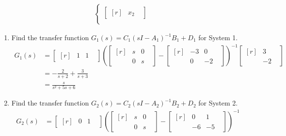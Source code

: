 \documentclass[11pt]{article}
\begin{document}
\begin{enumerate}
\begin{align*}
\begin{cases}
\begin{bmatrix*}[r]
                &x_2&
            \end{bmatrix*}\\
        \end{cases}
    \end{align*}
    \begin{enumerate}
        \item Find the transfer function \(G_1(s)=C_1{(sI-A_1)}^{-1}B_1+D_1\) for System 1.
        \begin{align*}
            G_1(s)&=
            \begin{bmatrix*}[r]
                &1&1&
            \end{bmatrix*}
            {\left(
                \begin{bmatrix*}[r]
                    &s & 0&\\
                    &0 & s&
                \end{bmatrix*}-
                \begin{bmatrix*}[r]
                    &-3 & 0&\\
                    &0 & -2&
                \end{bmatrix*}
            \right)}^{-1}
            \begin{bmatrix*}[r]
                &3&\\
                &-2&
            \end{bmatrix*}\\
            &=-\frac{2}{s+2}+\frac{3}{s+3}\\[0.75em]
            &=\frac{s}{s^2+5s+6}
        \end{align*}
        \item Find the transfer function \(G_2(s)=C_2{(sI-A_2)}^{-1}B_2+D_2\) for System 2.
        \begin{align*}
            G_2(s)&=
            \begin{bmatrix*}[r]
                &0&1&
            \end{bmatrix*}
            {\left(
                \begin{bmatrix*}[r]
                    &s & 0&\\
                    &0 & s&
                \end{bmatrix*}-
                \begin{bmatrix*}[r]
                    &0 & 1&\\
                    &-6 & -5&
                \end{bmatrix*}
            \right)}^{-1}

\end{align*}
\end{enumerate}
\end{enumerate}
\end{document}
